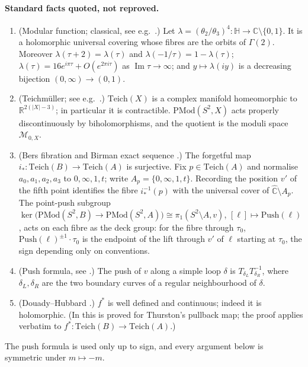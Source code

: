 \documentclass[11pt]{article}
\theoremstyle{definition}
\newcommand{\Teich}{\mathrm{Teich}}
\newcommand{\PMod}{\mathrm{PMod}}
\newcommand{\Ch}{\hat{\mathbb C}}
\newcommand{\HH}{\mathbb H}
\newcommand{\M}{\mathcal M}
\newcommand{\Push}{\mathrm{Push}}
\newcommand{\Img}{\operatorname{Im}}
\begin{document}
\paragraph{Standard facts quoted, not reproved.}
\begin{enumerate}[label=\textbf{(F\arabic*)},leftmargin=*]
\item \label{F1} (Modular function; classical, see e.g.\ \cite{Ahlfors,Chandra}.) Let $\lambda=(\theta_2/\theta_3)^4\colon\HH\to\mathbb C\setminus\{0,1\}$. It is a holomorphic universal covering whose fibres are the orbits of $\Gamma(2)$. Moreover $\lambda(\tau+2)=\lambda(\tau)$ and $\lambda(-1/\tau)=1-\lambda(\tau)$; $\lambda(\tau)=16e^{i\pi\tau}+O(e^{2\pi i\tau})$ as $\Img\tau\to\infty$; and $y\mapsto\lambda(iy)$ is a decreasing bijection $(0,\infty)\to(0,1)$.
\item \label{F2} (Teichm\"uller; see e.g.\ \cite{Hubbard}.) $\Teich(X)$ is a complex manifold homeomorphic to $\mathbb R^{2(|X|-3)}$; in particular it is contractible. $\PMod(S^2,X)$ acts properly discontinuously by biholomorphisms, and the quotient is the moduli space $\M_{0,X}$.
\item \label{F3} (Bers fibration and Birman exact sequence \cite{Bers,Birman,FM}.) The forgetful map $i_*\colon\Teich(B)\to\Teich(A)$ is surjective. Fix $p\in\Teich(A)$ and normalise $a_0,a_1,a_2,a_3$ to $0,\infty,1,t$; write $A_p=\{0,\infty,1,t\}$. Recording the position $v'$ of the fifth point identifies the fibre $i_*^{-1}(p)$ with the universal cover of $\Ch\setminus A_p$. The point-push subgroup $\ker\bigl(\PMod(S^2,B)\to\PMod(S^2,A)\bigr)\cong\pi_1(S^2\setminus A,v)$, $[\ell]\mapsto\Push(\ell)$, acts on each fibre as the deck group: for the fibre through $\tau_0$, $\Push(\ell)^{\pm1}\cdot\tau_0$ is the endpoint of the lift through $v'$ of $\ell$ starting at $\tau_0$, the sign depending only on conventions.
\item \label{F4} (Push formula, see \cite{FM}.) The push of $v$ along a simple loop $\delta$ is $T_{\delta_L}T_{\delta_R}^{-1}$, where $\delta_L,\delta_R$ are the two boundary curves of a regular neighbourhood of $\delta$.
\item \label{F5} (Douady--Hubbard \cite{DH}.) $f^*$ is well defined and continuous; indeed it is holomorphic. (In \cite{DH} this is proved for Thurston's pullback map; the proof applies verbatim to $f^*\colon\Teich(B)\to\Teich(A)$.)
\end{enumerate}
The push formula is used only up to sign, and every argument below is symmetric under $m\mapsto-m$.
\end{document}
